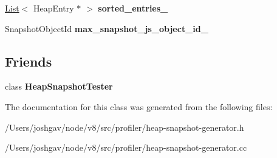 \begin{DoxyCompactItemize}
\item 
\hyperlink{classv8_1_1internal_1_1_list}{List}$<$ Heap\+Entry $\ast$ $>$ {\bfseries sorted\+\_\+entries\+\_\+}\hypertarget{classv8_1_1internal_1_1_heap_snapshot_a7876bf1c6ebbcedf9fff613b7202c07a}{}\label{classv8_1_1internal_1_1_heap_snapshot_a7876bf1c6ebbcedf9fff613b7202c07a}

\item 
Snapshot\+Object\+Id {\bfseries max\+\_\+snapshot\+\_\+js\+\_\+object\+\_\+id\+\_\+}\hypertarget{classv8_1_1internal_1_1_heap_snapshot_a2e1ba8caf542c0bfc8b8f2c6d10a67db}{}\label{classv8_1_1internal_1_1_heap_snapshot_a2e1ba8caf542c0bfc8b8f2c6d10a67db}

\end{DoxyCompactItemize}
\subsection*{Friends}
\begin{DoxyCompactItemize}
\item 
class {\bfseries Heap\+Snapshot\+Tester}\hypertarget{classv8_1_1internal_1_1_heap_snapshot_ab29592496458bcf1caa1bcb01dadb9c0}{}\label{classv8_1_1internal_1_1_heap_snapshot_ab29592496458bcf1caa1bcb01dadb9c0}

\end{DoxyCompactItemize}


The documentation for this class was generated from the following files\+:\begin{DoxyCompactItemize}
\item 
/\+Users/joshgav/node/v8/src/profiler/heap-\/snapshot-\/generator.\+h\item 
/\+Users/joshgav/node/v8/src/profiler/heap-\/snapshot-\/generator.\+cc\end{DoxyCompactItemize}
